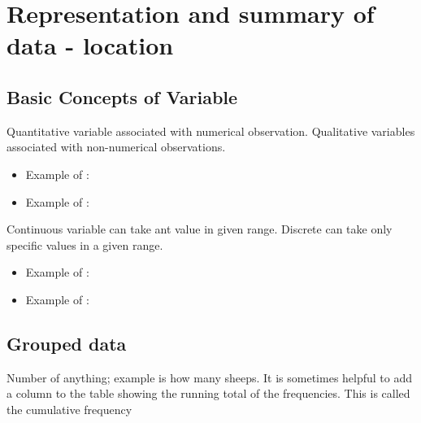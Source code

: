 \documentclass[a4paper]{article}
\begin{document}
\maketitle


\tableofcontents

\section{Representation and summary of data - location}
\subsection{Basic Concepts of Variable}
\begin{defi}
Quantitative variable associated with numerical observation. Qualitative variables associated with non-numerical observations.
\end{defi}
\begin{eg}
\begin{itemize}
\item Example of : 

\item Example of : 
\end{itemize}
\end{eg}
\begin{defi}
Continuous variable can take ant value in given range. Discrete can take only specific values in a given range.
\end{defi}
\begin{eg}
\begin{itemize}
\item Example of :
\item Example of :
\end{itemize}

\end{eg}

\subsection{Grouped data}
\begin{defi}

\end{defi}

\begin{defi}
Number of anything; example is how many sheeps.
It is sometimes helpful to add a column to the table showing the running total of the frequencies. This is called the cumulative frequency
\end{defi}
\end{document}

